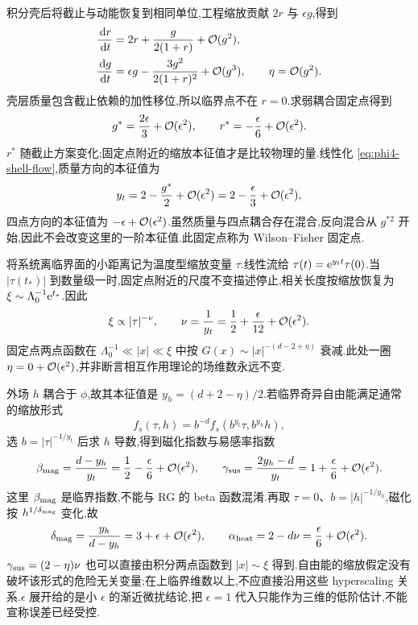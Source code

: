 积分壳后将截止与动能恢复到相同单位,工程缩放贡献 $2r$ 与 $\epsilon g$,得到
\begin{align}
 \frac{\,\mathrm d r}{\,\mathrm d t}&=2r+\frac{g}{2(1+r)}+\mathcal O(g^2),\notag\\
 \frac{\,\mathrm d g}{\,\mathrm d t}&=\epsilon g-
             \frac{3g^2}{2(1+r)^2}+\mathcal O(g^3),\qquad
 \eta=\mathcal O(g^2).
 \label{eq:phi4-shell-flow}
\end{align}
壳层质量包含截止依赖的加性移位,所以临界点不在 $r=0$.求弱耦合固定点得到
\begin{equation}
 g^*=\frac{2\epsilon}{3}+\mathcal O(\epsilon^2),\qquad
 r^*=-\frac\epsilon6+\mathcal O(\epsilon^2).
 \label{eq:wilson-fisher-fixed-point}
\end{equation}
$r^*$ 随截止方案变化;固定点附近的缩放本征值才是比较物理的量.线性化 \eqref{eq:phi4-shell-flow},质量方向的本征值为
\begin{equation}
 y_t=2-\frac{g^*}{2}+\mathcal O(\epsilon^2)
      =2-\frac\epsilon3+\mathcal O(\epsilon^2),
\end{equation}
四点方向的本征值为 $-\epsilon+\mathcal O(\epsilon^2)$.虽然质量与四点耦合存在混合,反向混合从 $g^{*2}$ 开始,因此不会改变这里的一阶本征值.此固定点称为 Wilson--Fisher 固定点.


将系统离临界面的小距离记为温度型缩放变量 $\tau$.线性流给 $\tau(t)=\mathrm e^{y_tt}\tau(0)$.当 $|\tau(t_*)|$ 到数量级一时,固定点附近的尺度不变描述停止,相关长度按缩放恢复为 $\xi\sim\Lambda_0^{-1}\mathrm e^{t_*}$.因此
\begin{equation}
 \xi\propto|\tau|^{-\nu},\qquad
 \nu=\frac1{y_t}=\frac12+\frac\epsilon{12}+\mathcal O(\epsilon^2).
 \label{eq:phi4-critical-nu}
\end{equation}
固定点两点函数在 $\Lambda_0^{-1}\ll|x|\ll\xi$ 中按
$G(x)\sim|x|^{-(d-2+\eta)}$ 衰减.此处一圈 $\eta=0+\mathcal O(\epsilon^2)$,并非断言相互作用理论的场维数永远不变.

外场 $h$ 耦合于 $\phi$,故其本征值是 $y_h=(d+2-\eta)/2$.若临界奇异自由能满足通常的缩放形式
\begin{equation}
 f_s(\tau,h)=b^{-d}f_s(b^{y_t}\tau,b^{y_h}h),
 \label{eq:critical-free-energy-scaling}
\end{equation}
选 $b=|\tau|^{-1/y_t}$ 后求 $h$ 导数,得到磁化指数与易感率指数
\begin{equation}
 \beta_{\rm mag}=\frac{d-y_h}{y_t}
       =\frac12-\frac\epsilon6+\mathcal O(\epsilon^2),\qquad
 \gamma_{\rm sus}=\frac{2y_h-d}{y_t}
       =1+\frac\epsilon6+\mathcal O(\epsilon^2).
\end{equation}
这里 $\beta_{\rm mag}$ 是临界指数,不能与 RG 的 beta 函数混淆.再取 $\tau=0$、$b=|h|^{-1/y_h}$,磁化按 $h^{1/\delta_{\rm mag}}$ 变化,故
\begin{equation}
 \delta_{\rm mag}=\frac{y_h}{d-y_h}=3+\epsilon+\mathcal O(\epsilon^2),\qquad
 \alpha_{\rm heat}=2-d\nu=\frac\epsilon6+\mathcal O(\epsilon^2).
\end{equation}
$\gamma_{\rm sus}=(2-\eta)\nu$ 也可以直接由积分两点函数到 $|x|\sim\xi$ 得到.自由能的缩放假定没有破坏该形式的危险无关变量;在上临界维数以上,不应直接沿用这些 hyperscaling 关系.$\epsilon$ 展开给的是小 $\epsilon$ 的渐近微扰结论,把 $\epsilon=1$ 代入只能作为三维的低阶估计,不能宣称误差已经受控.


